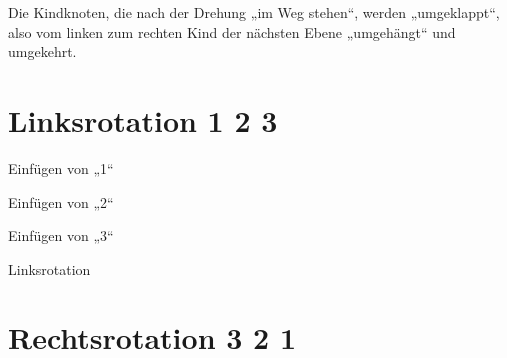 \documentclass{lehramt-informatik-haupt}
\begin{document}
Die Kindknoten, die nach der Drehung „im Weg stehen“, werden
„umgeklappt“, also vom linken zum rechten Kind der nächsten Ebene
„umgehängt“ und umgekehrt.

%

\section{Linksrotation 1 2 3}

\begin{multicols}{3}
\begin{liDiagramm}{Einfügen von „1“}
\end{liDiagramm}

\begin{liDiagramm}{Einfügen von „2“}
\end{liDiagramm}

\begin{liDiagramm}{Einfügen von „3“}
\end{liDiagramm}

\begin{liDiagramm}{Linksrotation}
\end{liDiagramm}
\end{multicols}

\section{Rechtsrotation 3 2 1}
\end{document}
